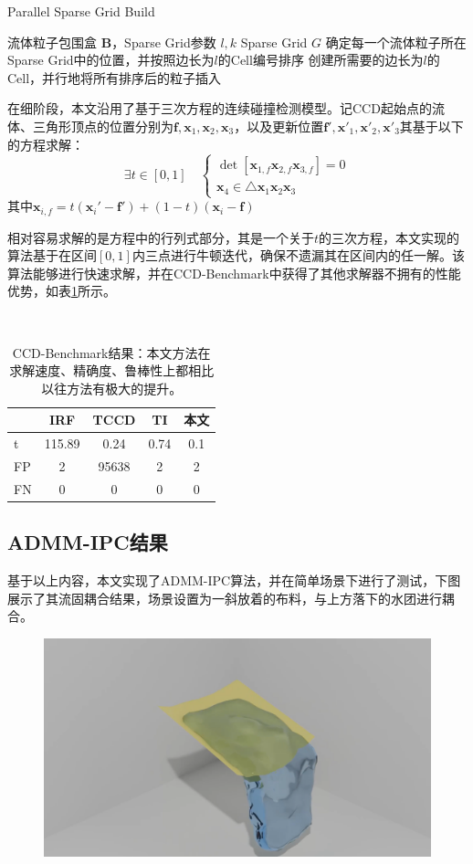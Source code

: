 \begin{algorithm}
  \caption{Parallel Sparse Grid Build}\label{alg:ipc-fluid-final}
  \begin{algorithmic}[1]
    \Require 流体粒子包围盒 $\mathbf B$，Sparse Grid参数 $l, k$
    \Ensure Sparse Grid $G$
    \State 确定每一个流体粒子所在Sparse Grid中的位置，并按照边长为$l$的Cell编号排序
    \State 创建所需要的边长为$l$的Cell，并行地将所有排序后的粒子插入
  \end{algorithmic}
\end{algorithm}

在细阶段，本文沿用了基于三次方程的连续碰撞检测模型。记CCD起始点的流体、三角形顶点的位置分别为$\mathbf{f},\mathbf{x}_{1},\mathbf{x}_{2},\mathbf{x}_{3}$，以及更新位置$\mathbf{f}',\mathbf{x}'_{1},\mathbf{x}'_{2},\mathbf{x}'_{3}$其基于以下的方程求解：
\begin{equation}
  \exists t \in [0, 1]\quad \begin{cases}
\det \left[\mathbf x_{1,f} \mathbf x_{2,f}\mathbf x_{3,f}\right] = 0\\
\mathbf x_4 \in \triangle \mathbf x_1\mathbf x_2\mathbf x_3
\end{cases}
\end{equation}
其中$\mathbf x_{i,f} = t (\mathbf x_i ' -\mathbf f') + (1-t) (\mathbf x_i -\mathbf f)$

相对容易求解的是方程中的行列式部分，其是一个关于$t$的三次方程，本文实现的算法基于在区间$[0,1]$内三点进行牛顿迭代，确保不遗漏其在区间内的任一解。该算法能够进行快速求解，并在CCD-Benchmark中获得了其他求解器不拥有的性能优势，如表\ref{tab:ccd-benchmark}所示。

\begin{table}
\centering \begin{tabular}{l|cccc}
   & IRF & TCCD & TI & 本文\\
  \hline
  t& 115.89 & 0.24 & 0.74 & 0.1 \\
  FP& 2 & 95638 & 2 & 2\\
  FN& 0 & 0 & 0 & 0
\end{tabular}
\caption{CCD-Benchmark结果：本文方法在求解速度、精确度、鲁棒性上都相比以往方法有极大的提升。}\label{tab:ccd-benchmark}
\end{table}

\subsection{ADMM-IPC结果}

基于以上内容，本文实现了ADMM-IPC算法，并在简单场景下进行了测试，下图展示了其流固耦合结果，场景设置为一斜放着的布料，与上方落下的水团进行耦合。

\begin{figure}
  \centering
  \includegraphics[width=0.9\linewidth]{img/well rendered-0001.png}
\end{figure}

